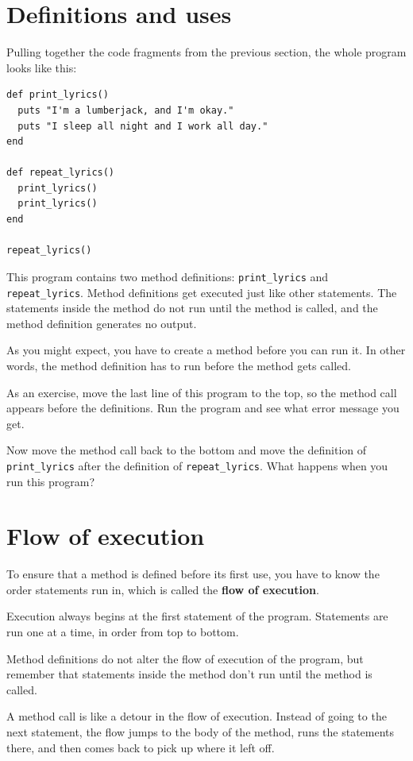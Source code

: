 \documentclass[10pt]{book}
\begin{document}
\section{Definitions and uses}

Pulling together the code fragments from the previous section, the
whole program looks like this:

\begin{verbatim}
def print_lyrics()
  puts "I'm a lumberjack, and I'm okay."
  puts "I sleep all night and I work all day."
end

def repeat_lyrics()
  print_lyrics()
  print_lyrics()
end

repeat_lyrics()
\end{verbatim}
%
This program contains two method definitions: \verb"print_lyrics" and
\verb"repeat_lyrics".  Method definitions get executed just like other
statements.  The statements
inside the method do not run until the method is called, and
the method definition generates no output.

As you might expect, you have to create a method before you can
run it.  In other words, the method definition has to run
before the method gets called.

As an exercise, move the last line of this program
to the top, so the method call appears before the definitions.  Run 
the program and see what error
message you get.

Now move the method call back to the bottom
and move the definition of \verb"print_lyrics" after the definition of
\verb"repeat_lyrics".  What happens when you run this program?


\section{Flow of execution}

To ensure that a method is defined before its first use,
you have to know the order statements run in, which is
called the {\bf flow of execution}.

Execution always begins at the first statement of the program.
Statements are run one at a time, in order from top to bottom.

Method definitions do not alter the flow of execution of the
program, but remember that statements inside the method don't
run until the method is called.

A method call is like a detour in the flow of execution.  Instead of
going to the next statement, the flow jumps to the body of
the method, runs the statements there, and then comes back
to pick up where it left off.
\end{document}
